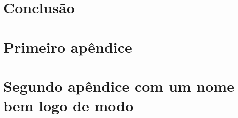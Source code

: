 \documentclass[12pt,openright,twoside,a4paper]{abntex2}
\begin{document}
\chapter*{Conclusão}

\lipsum[31-33]





%
%


\begin{apendicesenv}

\appendixpage

\chapter{Primeiro apêndice}

\lipsum[50-52]

\chapter{Segundo apêndice com um nome bem logo de modo}
\lipsum[55-57]
\end{apendicesenv}

\end{document}
